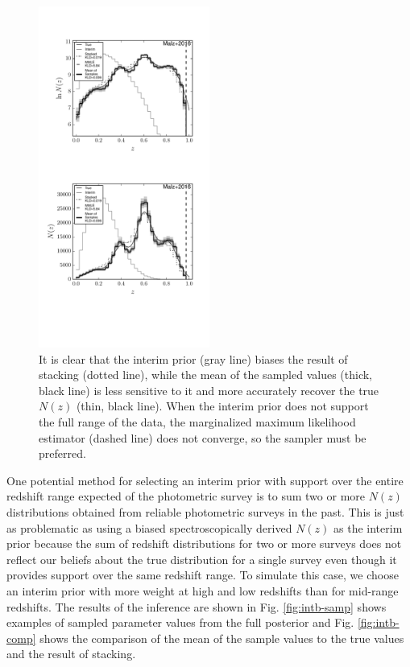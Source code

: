 \documentclass[preprint]{aastex}
\begin{document}
\begin{figure}
\includegraphics[width=0.5\textwidth]{figs/uint/comps.pdf}
\caption{It is clear that the interim prior (gray line) biases the result of 
stacking (dotted line), while the mean of the sampled values (thick, black 
line) is less sensitive to it and more accurately recover the true $N(z)$ 
(thin, black line).  When the interim prior does not support the full range of 
the data, the marginalized maximum likelihood estimator (dashed line) does not 
converge, so the sampler must be preferred.}
\label{fig:intu-comp}
\end{figure}

One potential method for selecting an interim prior with support over the 
entire redshift range expected of the photometric survey is to sum two or more 
$N(z)$ distributions obtained from reliable photometric surveys in the past.  
This is just as problematic as using a biased spectroscopically derived $N(z)$ 
as the interim prior because the sum of redshift distributions for two or more 
surveys does not reflect our beliefs about the true distribution for a single 
survey even though it provides support over the same redshift range.  To 
simulate this case, we choose an interim prior with more weight at high and low 
redshifts than for mid-range redshifts.  The results of the inference are shown 
in Fig. \ref{fig:intb-samp} shows examples of sampled parameter values from the 
full posterior and Fig. \ref{fig:intb-comp} shows the comparison of the mean of 
the sample values to the true values and the result of stacking.
\end{document}
